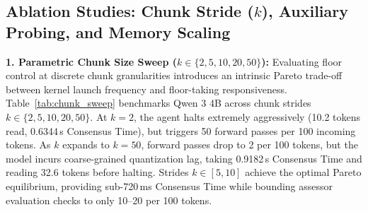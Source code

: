 \documentclass{article}
\begin{document}
\subsection{Ablation Studies: Chunk Stride \texorpdfstring{($k$)}{(k)}, Auxiliary Probing, and Memory Scaling}

\textbf{1. Parametric Chunk Size Sweep ($k \in \{2, 5, 10, 20, 50\}$):}
Evaluating floor control at discrete chunk granularities introduces an intrinsic Pareto trade-off between kernel launch frequency and floor-taking responsiveness. Table~\ref{tab:chunk_sweep} benchmarks Qwen 3 4B across chunk strides $k \in \{2, 5, 10, 20, 50\}$.
At $k=2$, the agent halts extremely aggressively (10.2 tokens read, 0.6344\,s Consensus Time), but triggers 50 forward passes per 100 incoming tokens. As $k$ expands to $k=50$, forward passes drop to 2 per 100 tokens, but the model incurs coarse-grained quantization lag, taking 0.9182\,s Consensus Time and reading 32.6 tokens before halting. Strides $k \in [5, 10]$ achieve the optimal Pareto equilibrium, providing sub-720\,ms Consensus Time while bounding assessor evaluation checks to only 10--20 per 100 tokens.

\begin{table}[h]
\centering
\caption{\textbf{Parametric Chunk Size ($k$) Ablation (Qwen 3 4B, 50 Scenarios).}}
\label{tab:chunk_sweep}
\vspace{0.2cm}
\end{table}
\end{document}
